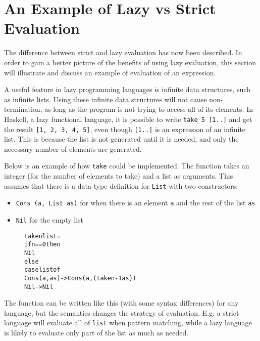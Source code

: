 \section{An Example of Lazy vs Strict Evaluation}
\label{intro:Example}
The difference between strict and lazy evaluation has now been described.
In order to gain a better picture of the benefits of using lazy evaluation,
this section will illustrate and discuss an example of evaluation of an
expression.

A useful feature in lazy programming languages is
infinite data structures, such as infinite lists. Using
these infinite data structures will not cause non-termination, as long as the
program is not trying to access all of its elements. In Haskell, a lazy
functional language, it is possible to write \texttt{take 5 [1..]} and get the
result \texttt{[1, 2, 3, 4, 5]}, even though \texttt{[1..]} is
an expression of an infinite list. This is because the list is not generated
until it is needed, and only the necessary number of elements are generated.

Below is an example of how \texttt{take} could be implemented. The function
takes an integer (for the number of elements to take) and a list as arguments.
This assumes that there is a data type definition for \texttt{List} with two
constructors:
\begin{itemize}
  \item \texttt{Cons (a, List as)} for when there is an element \texttt{a} and the rest of the list \texttt{as}
  \item \texttt{Nil} for the empty list
\end{itemize}

\begin{figure}[H]
\begin{alltt}
take n list =
  if n == 0 then
    Nil
  else
    case list of
      Cons (a, as) -> Cons (a, (take n-1 as))
      Nil          -> Nil
\end{alltt}
\end{figure}

\noindent The function can be written like this (with some syntax differences)
for any language, but the semantics
changes the strategy of evaluation. E.g. a strict language will evaluate
all of \texttt{list} when pattern matching, while a lazy language is likely to
evaluate only part of the list as much as needed. 
